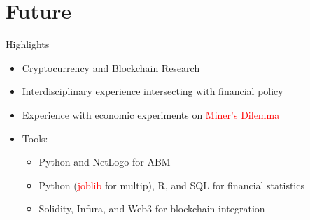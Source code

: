 \documentclass{beamer}
\begin{document}
\section{Future}

\begin{frame}{Highlights}
\begin{itemize}
\item Cryptocurrency and Blockchain Research
\item Interdisciplinary experience intersecting with financial policy
\item Experience with economic experiments on \textcolor{red}{Miner's Dilemma}
\item Tools: 
\begin{itemize}
    \item Python and NetLogo for ABM
    \item Python (\textcolor{red}{joblib} for multip), R, and SQL for financial statistics
    \item Solidity, Infura, and Web3 for blockchain integration
\end{itemize}
\end{itemize}
\end{frame}



\end{document}
